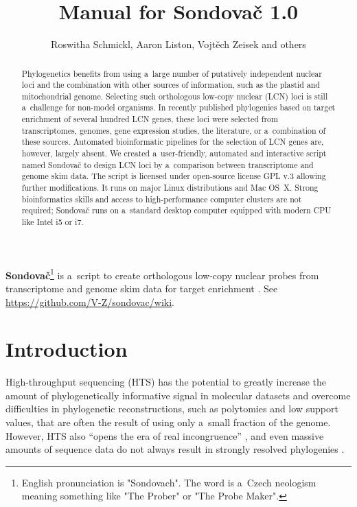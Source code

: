 \documentclass[a4paper, 11pt, twoside]{article}
\title{Manual for Sondovač 1.0}
\author{Roswitha Schmickl, Aaron Liston, Vojtěch Zeisek and others}
\begin{document}
\maketitle
\textbf{Sondovač}\footnote{English pronunciation is "Sondovach". The word is a~Czech neologism meaning something like "The Prober" or "The Probe Maker".} is a~script to create orthologous low-copy nuclear probes from transcriptome and genome skim data for target enrichment \citep{Schmickl2016}. See \url{https://github.com/V-Z/sondovac/wiki}.

\begin{abstract}
Phylogenetics benefits from using a~large number of putatively independent nuclear loci and the combination with other sources of information, such as the plastid and mitochondrial genome. Selecting such orthologous low-copy nuclear (LCN) loci is still a~challenge for non-model organisms. In recently published phylogenies based on target enrichment of several hundred LCN genes, these loci were selected from transcriptomes, genomes, gene expression studies, the literature, or a~combination of these sources. Automated bioinformatic pipelines for the selection of LCN genes are, however, largely absent. We created a~user-friendly, automated and interactive script named Sondovač to design LCN loci by a~comparison between transcriptome and genome skim data. The script is licensed under open-source license GPL v.3 allowing further modifications. It runs on major Linux distributions and Mac OS~X. Strong bioinformatics skills and access to high-performance computer clusters are not required; Sondovač runs on a~standard desktop computer equipped with modern CPU like Intel i5 or i7.
\end{abstract}

\tableofcontents
\listoffigures
\listoftables
\vskip 1cm



\section{Introduction}

High-throughput sequencing (HTS) has the potential to greatly increase the amount of phylogenetically informative signal in molecular datasets \citep{Parks2009, Parks2012} and overcome difficulties in phylogenetic reconstructions, such as polytomies and low support values, that are often the result of using only a~small fraction of the genome. However, HTS also “opens the era of real incongruence” \citep{Jeffroy2006}, and even massive amounts of sequence data do not always result in strongly resolved phylogenies \citep{Pyron2015}.
\end{document}
